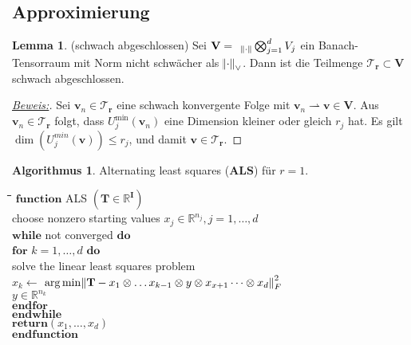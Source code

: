 \documentclass[11pt]{article} %
\theoremstyle{definition}
\newtheorem{lemma}[thm]{Lemma}
\newtheorem{alg}[thm]{Algorithmus}
\numberwithin{equation}{section}
\begin{document}
\subsection{Approximierung}
\begin{changemargin}{0pt}{0pt}

\begin{lemma} (schwach abgeschlossen)
Sei $\mathbf{V} = \hspace{2mm}_{\norm{\cdot}}\bigotimes^{d}_{j=1} V_{j}$ ein Banach-Tensorraum mit Norm nicht schwächer als $\norm{\cdot}_{\vee}$. Dann ist die Teilmenge $\mathcal{T}_{\mathbf{r}} \subset \mathbf{V}$ schwach abgeschlossen.
\end{lemma}
\begin{proof}[\underline{Beweis:}\nopunct]
Sei $\mathbf{v}_{n} \in \mathcal{T}_\mathbf{r}$ eine schwach konvergente Folge mit $\mathbf{v}_{n} \rightharpoonup \mathbf{v} \in \mathbf{V}$.
Aus $\mathbf{v}_{n} \in \mathcal{T}_\mathbf{r}$ folgt, dass $U^{\min}_{j}(\mathbf{v}_{n})$ eine Dimension kleiner oder gleich $r_{j}$ hat.
Es gilt $\dim(U^{min}_{j}(\mathbf{v}))\leq r_{j}$, und damit $\mathbf{v} \in \mathcal{T}_{\mathbf{r}}$.
\end{proof}

\begin{alg}
Alternating least squares ($\mathbf{ALS}$) für $r = 1$. \cite{tucker_tensorsketch}
\begin{tabbing}
\hspace*{5mm}\=\hspace*{5mm}\=\hspace*{5mm}\=\hspace{5mm}\=\hspace{1cm}\= \kill
$\mathbf{function }$ ALS \hspace{1mm} $(\mathbf{T} \in \mathbb{R}^{\mathbf{I}})$\\
\> choose nonzero starting values $x_{j} \in \mathbb{R}^{n_{j}}, j= 1,\dots,d$\\
\> $\mathbf{while}$ not converged $\mathbf{do}$\\
\> \> $\mathbf{for}$ \hspace{2mm} $k = 1,\dots,d$ \hspace{2mm} $\mathbf{do}$\\
\> \> \>solve the linear least squares problem\\
\> \> \> \> $x_{k} \leftarrow$ \> $\arg \min \norm{\mathbf{T} - x_{1}\otimes\dots x_{k-1}\otimes y \otimes x_{x+1} \dots
\otimes x_{d}}^{2}_{F}$\\
\> \> \> \> \> $y \in \mathbb{R}^{n_{k}}$\\
\> \> $\mathbf{end for}$\\
\> $\mathbf{end while}$\\
\> $\mathbf{return } (x_{1},\dots,x_{d})$\\
$\mathbf{end function}$
\end{tabbing}
\end{alg}

\end{changemargin}
\end{document}
